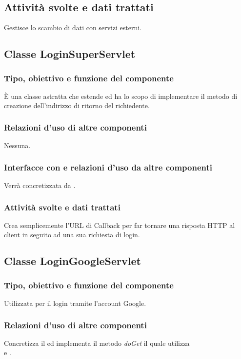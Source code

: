 \subsection*{Attivit\`a svolte e dati trattati}
Gestisce lo scambio di dati con servizi esterni.

\subsection{Classe LoginSuperServlet}
\subsubsection*{Tipo, obiettivo e funzione del componente}
\`E una classe astratta che estende  ed ha lo scopo di
implementare il metodo di creazione dell'indirizzo di ritorno del richiedente.

\subsubsection*{Relazioni d'uso di altre componenti}
Nessuna.

\subsubsection*{Interfacce con e relazioni d'uso da altre componenti}
Verr\`a concretizzata da .

\subsubsection*{Attivit\`a svolte e dati trattati}
Crea semplicemente l'URL di Callback per far tornare una risposta HTTP al
client in seguito ad una sua richiesta di login.

\subsection{Classe LoginGoogleServlet}
\subsubsection*{Tipo, obiettivo e funzione del componente}
Utilizzata per il login tramite l'account Google.

\subsubsection*{Relazioni d'uso di altre componenti}
Concretizza il  ed implementa il metodo \emph{doGet} il
quale utilizza \\ e .


